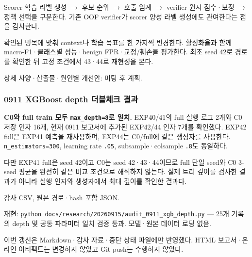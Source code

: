\par\noindent \textbullet\enspace Scorer 학습 라벨 생성  \ensuremath{\rightarrow}  후보 순위  \ensuremath{\rightarrow}  호출 임계  \ensuremath{\rightarrow}  verifier 원시 점수·보정  \ensuremath{\rightarrow}  정책 선택을 구분한다. 기존 OOF verifier가 scorer 양성 라벨 생성에도 관여한다는 점을 감사한다.


\par\noindent \textbullet\enspace 확인된 병목에 맞춰 context나 학습 목표를 한 가지씩 변경한다. 활성화율과 함께 macro-F1·클래스별 성능·benign FPR·교정/\allowbreak{}훼손을 평가한다. 최초 seed 42로 경로를 확인한 뒤 고정 조건에서 43·44로 재현성을 본다.


상세 사양·산출물·원인별 개선안: 미팅 후 계획.

\subsubsection{0911 XGBoost depth 더블체크 결과}
\textbf{C0와 full train 모두 \texttt{max\_\allowbreak{}\allowbreak{}dept\allowbreak{}h=\allowbreak{}\allowbreak{}8}로 일치.} EXP40/\allowbreak{}41의 full 실행 로그 2개와 C0 저장 인자 16개, 현재 0911 보고서에 추가된 EXP42/\allowbreak{}44 인자 7개를 확인했다. EXP42 full은 EXP41 예측을 재사용하며, EXP44는 C0/\allowbreak{}full에 같은 생성자를 사용한다. \texttt{n\_\allowbreak{}\allowbreak{}estima\allowbreak{}tors=\allowbreak{}\allowbreak{}300\allowbreak{}}, learning rate \texttt{.\allowbreak{}05}, subsample·colsample \texttt{.\allowbreak{}8}도 동일하다.

다만 EXP41 full은 seed 42이고 C0는 seed 42·43·44이므로 full 단일 seed와 C0 3-seed 평균을 완전히 같은 비교 조건으로 해석하지 않는다. 실제 트리 깊이를 검사한 결과가 아니라 실행 인자와 생성자에서 최대 깊이를 확인한 결과다.

\par\noindent \textbullet\enspace 감사 CSV, 원본 경로·hash 포함 JSON.


\par\noindent \textbullet\enspace 재현: \texttt{python d\allowbreak{}ocs/\allowbreak{}\allowbreak{}rese\allowbreak{}arch/\allowbreak{}\allowbreak{}202\allowbreak{}60915/\allowbreak{}\allowbreak{}au\allowbreak{}dit\_\allowbreak{}\allowbreak{}0911\allowbreak{}\_\allowbreak{}\allowbreak{}xgb\_\allowbreak{}\allowbreak{}dep\allowbreak{}th.\allowbreak{}py} — 25개 기록의 depth 및 공통 파라미터 일치 검증 통과. 모델·원본 데이터 로딩 없음.


이번 갱신은 Markdown·감사 자료·중단 상태 파일에만 반영했다. HTML 보고서·온라인 아티팩트는 변경하지 않았고 Git push는 수행하지 않았다.

